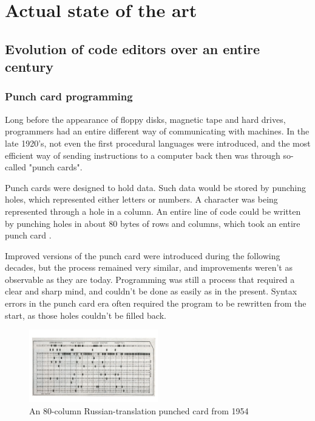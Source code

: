 \chapter{Actual state of the art}
\thispagestyle{pagestyle}

\section{Evolution of code editors over an entire century}
\subsection{Punch card programming}

Long before the appearance of floppy disks, magnetic tape and hard drives, programmers had an entire different way of communicating with machines. In the late 1920's, not even the first procedural languages were introduced, and the most efficient way of sending instructions to a computer back then was through so-called "punch cards".

Punch cards were designed to hold data. Such data would be stored by punching holes, which represented either letters or numbers. A character was being represented through a hole in a column. An entire line of code could be written by punching holes in about 80 bytes of rows and columns, which took an entire punch card \cite{ibm}.

Improved versions of the punch card were introduced during the following decades, but the process remained very similar, and improvements weren't as observable as they are today. Programming was still a process that required a clear and sharp mind, and couldn't be done as easily as in the present. Syntax errors in the punch card era often required the program to be rewritten from the start, as those holes couldn't be filled back.

\begin{figure}[h]
\centering
\includegraphics[width=0.5\textwidth]{images/punchcard.jpeg}
\caption{An 80-column Russian-translation punched card from 1954}
\label{fig:fig2,1.}
\end{figure}

